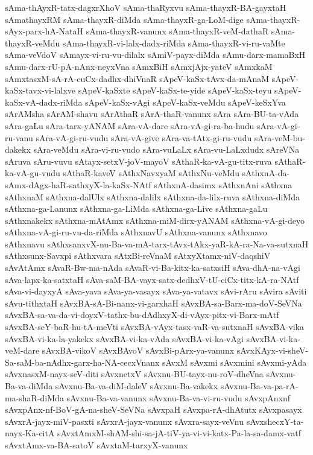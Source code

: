 {sAma-thAyxR-tatx-dagxrXhoV
sAma-thaRyxvu
sAma-thayxR-BA-gayxtaH
sAmathayxRM
sAma-thayxR-diMda
sAma-thayxR-ga-LoM-dige
sAma-thayxR-sAyx-parx-hA-NataH
sAma-thayxR-vanunx
sAma-thayxR-veM-dathaR
sAma-thayxR-veMdu
sAma-thayxR-vi-lalx-dadx-riMda
sAma-thayxR-vi-ru-vaMte
sAma-veVdoV
sAmayx-vi-ru-vu-dilalx
sAmiV-payx-diMda
sAmu-darx-mamaBxH
sAmu-darx-rU-pA-nAnx-neyxVna
sAmxBiH
sAmxjAjx-yateV
sAmxkaM
sAmxtasxM-sA-rA-cuCx-dadhx-dhiVnaR
sApeV-kaSx-tAvx-da-mAnaM
sApeV-kaSx-tavx-vi-lalxve
sApeV-kaSxte
sApeV-kaSx-te-yide
sApeV-kaSx-teyu
sApeV-kaSx-vA-dadx-riMda
sApeV-kaSx-vAgi
sApeV-kaSx-veMdu
sApeV-keSxYva
sArAMsha
sArAM-shavu
sArAthaR
sArA-thaR-vanunx
sAra
sAra-BU-ta-vAda
sAra-gaLu
sAra-tarx-yANAM
sAra-vA-dare
sAra-vA-gi-ra-ba-hudu
sAra-vA-gi-ru-vanu
sAra-vA-gi-ru-vudu
sAra-vA-give
sAra-va-tAtx-gi-ru-vudu
sAra-veM-bu-dakekx
sAra-veMdu
sAra-vi-ru-vudo
sAra-vuLaLx
sAra-vu-LaLxdudx
sAreVNa
sAruva
sAru-vuvu
sAtayx-setxV-joV-mayoV
sAthaR-ka-vA-gu-titx-ruva
sAthaR-ka-vA-gu-vudu
sAthaR-kaveV
sAthxNavxyaM
sAthxNu-veMdu
sAthxnA-da-sAmx-dAgx-haR-sathxyX-la-kaSx-NAtf
sAthxnA-dasimx
sAthxnAni
sAthxna
sAthxnaM
sAthxna-dalUlx
sAthxna-dalilx
sAthxna-da-lilx-ruva
sAthxna-diMda
sAthxna-ga-Lanunx
sAthxna-ga-LiMda
sAthxna-ga-Live
sAthxna-gaLu
sAthxnakekx
sAthxna-mAtAmx
sAthxna-miM-dirx-yANAM
sAthxna-vA-gi-deyo
sAthxna-vA-gi-ru-vu-da-riMda
sAthxnavU
sAthxna-vanunx
sAthxnavo
sAthxnavu
sAthxsanxvX-nu-Ba-va-mA-tarx-tAvx-tAkx-yaR-kA-ra-Na-va-sutxnaH
sAthxsunx-Savxpi
sAthxvara
sAtxBi-reVnaM
sAtxyXtamx-niV-daqshiV
sAvAtAmx
sAvaR-Bw-ma-nAda
sAvaR-vi-Ba-kitx-ka-satxsiH
sAva-dhA-na-vAgi
sAva-lapx-ka-satxtaH
sAva-saM-BA-vayx-satx-dedhxV-tU-ciCx-titx-kA-ra-NAtf
sAva-vi-dayxyA
sAva-yava
sAva-ya-vasayx
sAva-ya-vatavx
sAvi-rAru
sAvira
sAviti
sAvu-tithxtaH
sAvxBA-sA-Bi-nanx-vi-garxhaH
sAvxBA-sa-Barx-ma-doV-SeVNa
sAvxBA-sa-va-da-vi-doyxV-tathx-bu-dAdhxyX-di-vAyx-pitx-vi-Barx-mAtf
sAvxBA-seY-baR-hu-tA-meVti
sAvxBA-vAyx-tasx-vaR-va-sutxnaH
sAvxBA-vika
sAvxBA-vi-ka-la-yakekx
sAvxBA-vi-ka-vAda
sAvxBA-vi-ka-vAgi
sAvxBA-vi-ka-veM-dare
sAvxBA-vikoV
sAvxBAvoV
sAvxBi-pArx-ya-vanunx
sAvxKAyx-vi-sheV-Sa-saM-ba-nAdhx-garx-ha-NA-cecxVnanx
sAvxM
sAvxmi
sAvxmini
sAvxmi-yAda
sAvxnasxM-nayx-seV-diti
sAvxnetxV
sAvxnu-BU-tayx-nu-roV-dheVna
sAvxnu-Ba-va-diMda
sAvxnu-Ba-va-diM-daleV
sAvxnu-Ba-vakekx
sAvxnu-Ba-va-pa-rA-ma-shaR-diMda
sAvxnu-Ba-va-vanunx
sAvxnu-Ba-va-vi-ru-vudu
sAvxpAnxnf
sAvxpAnx-nf-BoV-gA-na-sheV-SeVNa
sAvxpaH
sAvxpa-rA-dhAtutx
sAvxpasayx
sAvxrA-jayx-miV-pasxti
sAvxrA-jayx-vanunx
sAvxra-sayx-veVnu
sAvxshecxY-ta-nayx-Ka-citA
sAvxtAmxM-shAM-shi-sa-jA-tiV-ya-vi-vi-katx-Pa-la-sa-damx-vatf
sAvxtAmx-va-BA-satoV
sAvxtaM-tarxyX-vanunx
}
